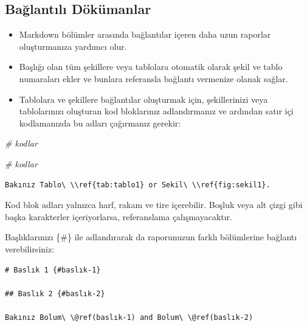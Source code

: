 \documentclass[
  oneside]{book}
\newenvironment{Shaded}{\begin{snugshade}}{\end{snugshade}}
\newcommand{\CommentTok}[1]{\textcolor[rgb]{0.56,0.35,0.01}{\textit{#1}}}
\begin{document}
\hypertarget{baux11flantux131lux131-duxf6kuxfcmanlar}{%
\subsection{Bağlantılı Dökümanlar}\label{baux11flantux131lux131-duxf6kuxfcmanlar}}

\begin{itemize}
\item
  Markdown bölümler arasında bağlantılar içeren daha uzun raporlar oluşturmanıza yardımcı olur.
\item
  Başlığı olan tüm şekillere veya tablolara otomatik olarak şekil ve tablo numaraları ekler ve bunlara referansla bağlantı vermenize olanak sağlar.
\item
  Tablolara ve şekillere bağlantılar oluşturmak için, şekillerinizi veya tablolarınızı oluşturan kod bloklarınız adlandırmanız ve ardından satır içi kodlamanızda bu adları çağırmanız gerekir:
\end{itemize}

\begin{Shaded}
\begin{Highlighting}[]
\CommentTok{\# kodlar}
\end{Highlighting}
\end{Shaded}

\begin{Shaded}
\begin{Highlighting}[]
\CommentTok{\# kodlar}
\end{Highlighting}
\end{Shaded}

\begin{verbatim}
Bakınız Tablo\ \\ref{tab:tablo1} or Sekil\ \\ref{fig:sekil1}.
\end{verbatim}

\begin{warning}
Kod blok adları yalnızca harf, rakam ve tire içerebilir. Boşluk veya alt çizgi gibi başka karakterler içeriyorlarsa, referanslama çalışmayacaktır.

\end{warning}

Başlıklarınızı \{\#\} ile adlandırarak da raporunuzun farklı bölümlerine bağlantı verebilirsiniz:

\begin{verbatim}
# Baslık 1 {#baslık-1}

## Baslık 2 {#baslık-2}

Bakınız Bolum\ \@ref(baslık-1) and Bolum\ \@ref(baslık-2)
\end{verbatim}
\end{document}
